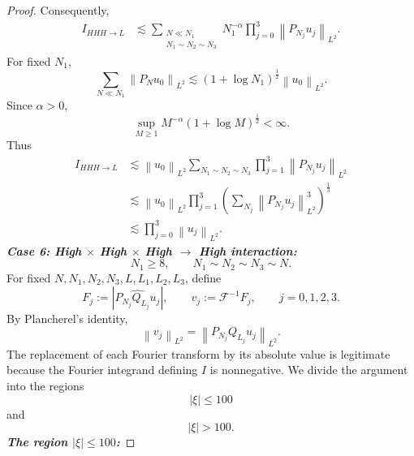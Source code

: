 \documentclass[12pt,oneside,reqno]{amsart}
\numberwithin{equation}{section}
\theoremstyle{plain}
\newcommand{\abs}[1]{%
    \left|#1\right|%
}
\newcommand{\Lpn}[2]{%
    \left\lVert #1\right\rVert_{L^{#2}}%
}
\newcommand{\Fh}[1]{\widehat{#1}}
\newcommand{\Ifr}[4]{%
    I_{{#1}{#2}{#3}\to{#4}}%
}
\begin{document}
\begin{proof}
Consequently,
\begin{align}
\Ifr{H}{H}{H}{L}
&\lesssim
\sum_{\substack{
N\ll N_1\\
N_1\sim N_2\sim N_3
}}
N_1^{-\alpha}
\prod_{j=0}^3
\Lpn{P_{N_j}u_j}{2}.
\label{eq:case5-spatial}
\end{align}
For fixed $N_1$,
\begin{equation}
    \sum_{N\ll N_1}
    \Lpn{P_Nu_0}{2}
    \lesssim
    (1+\log N_1)^{\frac12}
    \Lpn{u_0}{2}.
\end{equation}
Since $\alpha>0$,
\begin{equation}
    \sup_{M\geq1}
    M^{-\alpha}
    (1+\log M)^{\frac12}
    <\infty.
\end{equation}
Thus
\begin{align}
\Ifr{H}{H}{H}{L}
&\lesssim
\Lpn{u_0}{2}
\sum_{N_1\sim N_2\sim N_3}
\prod_{j=1}^3
\Lpn{P_{N_j}u_j}{2}
\nonumber\\
&\lesssim
\Lpn{u_0}{2}
\prod_{j=1}^3
\left(
    \sum_{N_j}
    \Lpn{P_{N_j}u_j}{2}^3
\right)^{\frac13}
\nonumber\\
&\lesssim
\prod_{j=0}^3
\Lpn{u_j}{2}.
\label{eq:case5-final}
\end{align}
\medskip
\noindent
\textbf{\emph{Case 6: High $\times$ High $\times$ High $\to$ High interaction:}}
\begin{equation}
\label{eq:case6-frequency-comparability}
    N_1\geq8,
    \qquad
    N_1\sim N_2\sim N_3\sim N.
\end{equation}
For fixed $N,N_1,N_2,N_3,L,L_1,L_2,L_3$, define
\begin{equation}
\label{eq:case6-Fj}
    F_j
    :=
    \abs{
        \Fh{
            P_{N_j}Q_{L_j}u_j
        }
    },
    \qquad
    v_j
    :=
    \mathcal F^{-1}F_j,
    \qquad
    j=0,1,2,3.
\end{equation}
By Plancherel's identity,
\begin{equation}
\label{eq:case6-majorant-L2}
    \Lpn{v_j}{2}
    =
    \Lpn{P_{N_j}Q_{L_j}u_j}{2}.
\end{equation}
The replacement of each Fourier transform by its absolute value is legitimate because the Fourier integrand defining $I$ is nonnegative.  We divide the argument into the regions
\begin{equation}
    \abs{\xi}\leq100
\end{equation}
and
\begin{equation}
    \abs{\xi}>100.
\end{equation}
\medskip
\noindent
\textbf{\emph{The region $\abs{\xi}\leq100$:}}

\end{proof}
\end{document}
